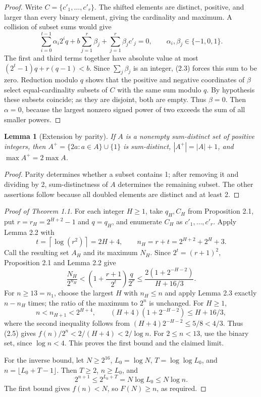 \documentclass[reqno]{amsart}
\newtheorem{lemma}[theorem]{Lemma}
\theoremstyle{remark}
\numberwithin{equation}{section}
\begin{document}
\begin{proof}
Write $C=\{c'_1,\ldots,c'_r\}$.  The shifted elements are distinct, positive, and larger than
every binary element, giving the cardinality and maximum.  A collision of subset sums would give
\[
\sum_{i=0}^{t-1}\alpha_i2^iq+b\sum_{j=1}^r\beta_j
+\sum_{j=1}^r\beta_jc'_j=0,
\qquad \alpha_i,\beta_j\in\{-1,0,1\}.
\tag{2.3}
\]
The first and third terms together have absolute value at most
$(2^t-1)q+r(q-1)<b$.  Since $\sum_j\beta_j$ is an integer, (2.3) forces this sum to be zero.
Reduction modulo $q$ shows that the positive and negative coordinates of $\beta$ select
equal-cardinality subsets of $C$ with the same sum modulo $q$.  By hypothesis these subsets
coincide; as they are disjoint, both are empty.  Thus $\beta=0$.  Then $\alpha=0$, because the
largest nonzero signed power of two exceeds the sum of all smaller powers.
\end{proof}

\begin{lemma}[Extension by parity]
If $A$ is a nonempty sum-distinct set of positive integers, then
$A^+=\{2a:a\in A\}\cup\{1\}$ is sum-distinct, $|A^+|=|A|+1$, and
$\max A^+=2\max A$.
\end{lemma}

\begin{proof}
Parity determines whether a subset contains 1; after removing it and dividing by 2,
sum-distinctness of $A$ determines the remaining subset.  The other assertions follow because all
doubled elements are distinct and at least 2.
\end{proof}

\begin{proof}[Proof of Theorem 1.1]
For each integer $H\geq 1$, take $q_H,C_H$ from Proposition 2.1, put
$r=r_H=2^{H+2}-1$ and $q=q_H$, and enumerate $C_H$ as $c'_1,\ldots,c'_r$.  Apply Lemma 2.2
with
\[
t=\left\lceil\log(r^2)\right\rceil=2H+4,
\qquad n_H=r+t=2^{H+2}+2^H+3.
\tag{2.4}
\]
Call the resulting set $A_H$ and its maximum $N_H$.  Since $2^t=(r+1)^2$, Proposition 2.1
and Lemma 2.2 give
\[
\frac{N_H}{2^{n_H}}
<\left(1+\frac{r+1}{2^t}\right)\frac{q}{2^r}
\leq\frac{2(1+2^{-H-2})}{H+16/3}.
\tag{2.5}
\]
For $n\geq 13=n_1$, choose the largest $H$ with $n_H\leq n$ and apply Lemma 2.3 exactly
$n-n_H$ times; the ratio of the maximum to $2^n$ is unchanged.  For $H\geq 1$,
\[
n<n_{H+1}<2^{H+4},
\qquad (H+4)(1+2^{-H-2})\leq H+16/3,
\]
where the second inequality follows from $(H+4)2^{-H-2}\leq 5/8<4/3$.  Thus (2.5) gives
$f(n)/2^n<2/(H+4)<2/\log n$.  For $2\leq n<13$, use the binary set, since $\log n<4$.
This proves the first bound and the claimed limit.

For the inverse bound, let $N\geq 2^{16}$, $L_0=\log N$, $T=\log\log L_0$, and
$n=\lfloor L_0+T-1\rfloor$.  Then $T\geq 2$, $n\geq L_0$, and
\[
2^{n+1}\leq 2^{L_0+T}=N\log L_0\leq N\log n.
\]
The first bound gives $f(n)<N$, so $F(N)\geq n$, as required.
\end{proof}
\end{document}
